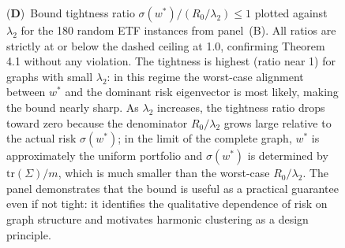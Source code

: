 \begin{figure}[!htbp]
{    (\textbf{D})~Bound tightness ratio $\sigma(w^*)/(R_0/\lambda_2) \leq 1$ plotted against $\lambda_2$ for the 180 random ETF instances from panel~(B).  All ratios are strictly at or below the dashed ceiling at 1.0, confirming Theorem 4.1 without any violation.  The tightness is highest (ratio near 1) for graphs with small $\lambda_2$: in this regime the worst-case alignment between $w^*$ and the dominant risk eigenvector is most likely, making the bound nearly sharp.  As $\lambda_2$ increases, the tightness ratio drops toward zero because the denominator $R_0/\lambda_2$ grows large relative to the actual risk $\sigma(w^*)$; in the limit of the complete graph, $w^*$ is approximately the uniform portfolio and $\sigma(w^*)$ is determined by $\mathrm{tr}(\Sigma)/m$, which is much smaller than the worst-case $R_0/\lambda_2$.  The panel demonstrates that the bound is useful as a practical guarantee even if not tight: it identifies the qualitative dependence of risk on graph structure and motivates harmonic clustering as a design principle.}
    \label{fig:etf_panel_4}
\end{figure}

